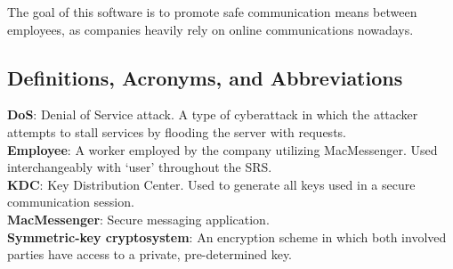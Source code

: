 \documentclass[]{article}
\begin{document}
\hspace{5mm}The goal of this software is to promote safe communication means between employees, as companies heavily rely on online communications nowadays. 


\subsection{Definitions, Acronyms, and Abbreviations}
\label{sub:definitions_acronyms_and_abbreviations}
\textbf{DoS}: Denial of Service attack. A type of cyberattack in which the attacker attempts to stall services by flooding the server with requests.\vspace{2mm}\\
\textbf{Employee}: A worker employed by the company utilizing MacMessenger. Used interchangeably with ‘user’ throughout the SRS.\vspace{2mm}\\
\textbf{KDC}: Key Distribution Center. Used to generate all keys used in a secure communication session.\vspace{2mm}\\
\textbf{MacMessenger}: Secure messaging application.\vspace{2mm}\\
\textbf{Symmetric-key cryptosystem}: An encryption scheme in which both involved parties have access to a private, pre-determined key.\\

\end{document}
